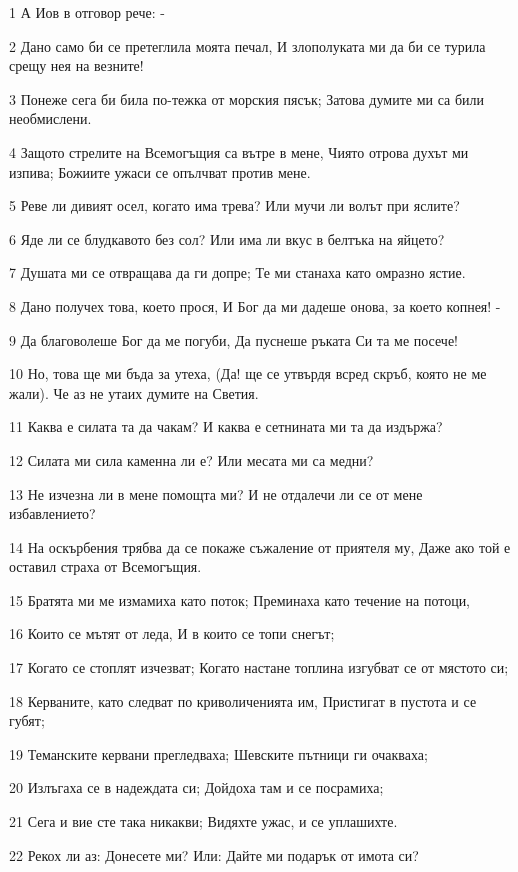 \par 1 А Иов в отговор рече: -
\par 2 Дано само би се претеглила моята печал, И злополуката ми да би се турила срещу нея на везните!
\par 3 Понеже сега би била по-тежка от морския пясък; Затова думите ми са били необмислени.
\par 4 Защото стрелите на Всемогъщия са вътре в мене, Чиято отрова духът ми изпива; Божиите ужаси се опълчват против мене.
\par 5 Реве ли дивият осел, когато има трева? Или мучи ли волът при яслите?
\par 6 Яде ли се блудкавото без сол? Или има ли вкус в белтъка на яйцето?
\par 7 Душата ми се отвращава да ги допре; Те ми станаха като омразно ястие.
\par 8 Дано получех това, което прося, И Бог да ми дадеше онова, за което копнея! -
\par 9 Да благоволеше Бог да ме погуби, Да пуснеше ръката Си та ме посече!
\par 10 Но, това ще ми бъда за утеха, (Да! ще се утвърдя всред скръб, която не ме жали). Че аз не утаих думите на Светия.
\par 11 Каква е силата та да чакам? И каква е сетнината ми та да издържа?
\par 12 Силата ми сила каменна ли е? Или месата ми са медни?
\par 13 Не изчезна ли в мене помощта ми? И не отдалечи ли се от мене избавлението?
\par 14 На оскърбения трябва да се покаже съжаление от приятеля му, Даже ако той е оставил страха от Всемогъщия.
\par 15 Братята ми ме измамиха като поток; Преминаха като течение на потоци,
\par 16 Които се мътят от леда, И в които се топи снегът;
\par 17 Когато се стоплят изчезват; Когато настане топлина изгубват се от мястото си;
\par 18 Керваните, като следват по криволиченията им, Пристигат в пустота и се губят;
\par 19 Теманските кервани прегледваха; Шевските пътници ги очакваха;
\par 20 Излъгаха се в надеждата си; Дойдоха там и се посрамиха;
\par 21 Сега и вие сте така никакви; Видяхте ужас, и се уплашихте.
\par 22 Рекох ли аз: Донесете ми? Или: Дайте ми подарък от имота си?
